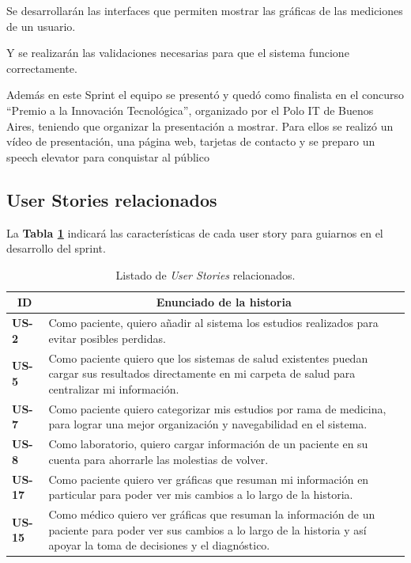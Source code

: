 Se desarrollarán las interfaces que permiten mostrar las gráficas de las mediciones de un usuario.

Y se realizarán las validaciones necesarias para que el sistema funcione correctamente.


Además en este Sprint el equipo se presentó y quedó como finalista en el  concurso ``Premio a la Innovación Tecnológica'', organizado por el Polo IT de Buenos Aires, teniendo que organizar la presentación a mostrar. Para ellos se realizó un vídeo de presentación, una página web, tarjetas de contacto y se preparo un speech elevator para conquistar al público


\subsection{User Stories relacionados}
La \textbf{Tabla \ref{US-Sprint3}} indicará las características de cada user story para guiarnos en el desarrollo del sprint.

\begin{table}[h]
    \centering
	\begin{tabular}{|l|p{9cm}|}
	\hline
        \multicolumn{1}{|c|}{\textbf{ID}} &
        \multicolumn{1}{c|}{\textbf{Enunciado de la historia}} \\          
    \hline
        \textbf{US-2} & Como paciente, quiero añadir al sistema los estudios realizados para evitar posibles perdidas.\\
     \hline 
        \textbf{US-5} & Como paciente quiero que los sistemas de salud existentes puedan cargar sus resultados directamente en mi carpeta de salud para centralizar mi información. \\
      \hline 
        \textbf{US-7} & Como paciente quiero categorizar mis estudios por rama de medicina, para lograr una mejor organización y navegabilidad en el sistema. \\
       \hline 
        \textbf{US-8} & Como laboratorio, quiero cargar información de un paciente en su cuenta para ahorrarle las molestias de volver. \\
    \hline 
	    \textbf{US-17} &   Como paciente quiero ver gráficas que resuman mi información en particular para poder ver mis cambios a lo largo de la historia.\\
    \hline        
        \textbf{US-15} & Como médico quiero ver gráficas que resuman la información de un paciente para poder ver sus cambios a lo largo de la historia y así apoyar la toma de decisiones y el diagnóstico.\\
    \hline
    \end{tabular}
    \caption{Listado de \textit{User Stories} relacionados.}
    \label{US-Sprint3}
\end{table}


